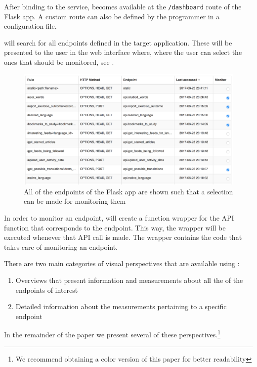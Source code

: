 \documentclass[conference]{IEEEtran}
\begin{document}
  After binding to the service, \tool becomes available at the \texttt{/dashboard} route of the Flask app. A custom route can also be defined by the programmer in a configuration file.

  \tool will search for all endpoints defined in the target application. These will be presented to the user in the \tool web interface where, where the user can select the ones that should be monitored, see . 

    \begin{figure}[h!]
      \centering
      \includegraphics[width=\linewidth]{selecting_endpoints.png}
      \caption{All of the endpoints of the Flask app are shown such that a selection can be made for monitoring them}
      \label{fig:sep}
    \end{figure}

  In order to monitor an endpoint, \tool will create a function wrapper for the API function that corresponds to the endpoint. This way, the wrapper will be executed whenever that API call is made. The wrapper contains the code that takes care of monitoring an endpoint.


  There are two main categories of visual perspectives that are available using \tool:
  \begin{enumerate}
    \item Overviews that present information and measurements about all the of the endpoints of interest
    \item Detailed information about the measurements pertaining to a specific endpoint
  \end{enumerate}

  In the remainder of the paper we present several of these perspectives.\footnote{We recommend obtaining a color version of this paper for better readability}
\end{document}
